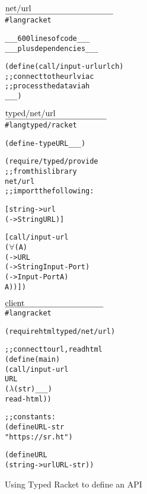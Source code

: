 \def\fname#1#2{$\underline{\hbox to #2in{#1}}$\\[-2ex]}

\begin{figure}[htb]\footnotesize
  \vspace{-1mm}

\begin{minipage}[t]{1.90in}
\begin{alltt}\fname{net/url}{1.8}
#lang racket 

_ _ _ 600 lines of code _ _ _
_ _ _ plus dependencies _ _ _

(define (call/input-url url c h)
  ;; connect to the url via c
  ;; process the data via h
  _ _ _)


\end{alltt}
\end{minipage}\begin{minipage}[t]{1.90in}
\begin{alltt}\fname{typed/net/url}{1.7}
#lang typed/racket
 
(define-type URL _ _ _)

(require/typed/provide
 ;; from this library
 net/url
 ;; import the following:

 [string->url 
  (-> String URL)]

 [call/input-url 
  (\(\forall\) (A)
   (-> URL 
       (-> String Input-Port)
       (-> Input-Port A)
       A))])
\end{alltt}\end{minipage}\begin{minipage}[t]{1.65in}
\begin{alltt}\fname{client}{1.65}
#lang racket

(require html typed/net/url)

;; connect to url, read html
(define (main)
  (call/input-url 
   URL
   (\(\lambda\) (str) _ _ _)
   read-html))

;; constants: 
(define URL-str
  "https://sr.ht")

(define URL
  (string->url URL-str))
\end{alltt}\end{minipage}

  \caption{Using Typed Racket to define an API} \label{fig:tr-example}

  \vspace{-1mm}
\end{figure}

